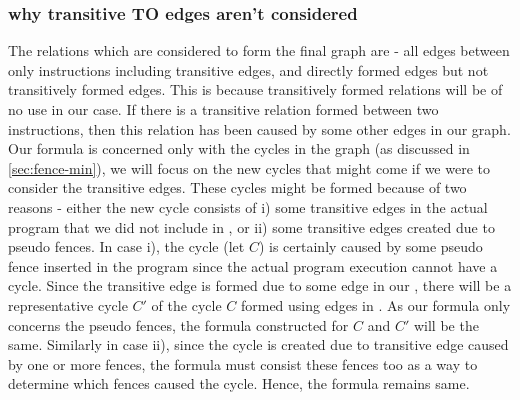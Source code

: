 \subsubsection{why transitive TO edges aren't considered} \label{sec:no-transitive}
The relations which are considered to form the final graph are - 
all \setSB edges between only \mosc instructions including transitive \setSB edges, 
and directly formed \setTO edges but not transitively formed \setTO edges.  
This is because transitively formed \setTO relations will be of 
no use in our case. If there is a transitive \setTO relation formed 
between two instructions, then this relation has been caused by 
some other edges in our graph. 
Our formula is concerned only with the cycles in the graph 
(as discussed in \textsection\ref{sec:fence-min}), we will focus on 
the new cycles that might come if we were to consider the transitive 
edges. These cycles might be formed because of two reasons - 
either the new cycle consists of i) some transitive edges in the 
actual program that we did not include in \setTO, or ii) some 
transitive edges created due to pseudo fences. In case i), the cycle 
(let $C$) is certainly caused by some pseudo fence inserted in the program 
since the actual program execution cannot have a cycle. Since the 
transitive edge is formed due to some edge in our \setTO, there 
will be a representative cycle $C'$ of the cycle $C$ formed using 
edges in \setTO. As our formula only concerns the pseudo fences, 
the formula constructed for $C$ and $C'$ will be the same. 
Similarly in case ii), since the cycle is created due to transitive 
edge caused by one or more fences, the formula must consist these 
fences too as a way to determine which fences caused the cycle. Hence,
the formula remains same. 


